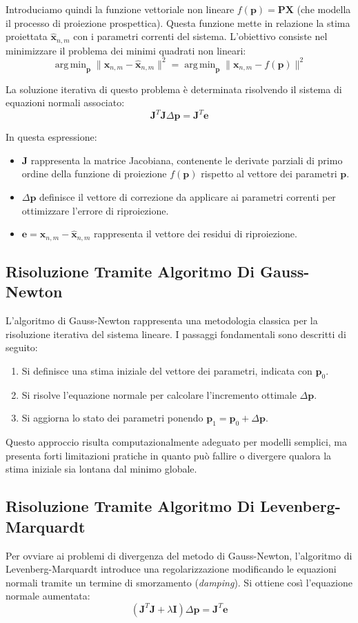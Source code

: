 ﻿\documentclass[11pt, a4paper]{article}
\DeclareMathOperator*{\argmin}{arg\,min}
\begin{document}
Introduciamo quindi la funzione vettoriale non lineare $f(\bm{p}) = \bm{P}\bm{X}$ (che modella il processo di proiezione prospettica). Questa funzione mette in relazione la stima proiettata $\hat{\bm{x}}_{n,m}$ con i parametri correnti del sistema. L'obiettivo consiste nel minimizzare il problema dei minimi quadrati non lineari:
\[ \boxed{\argmin_{\bm{p}} \lVert \bm{x}_{n,m} - \hat{\bm{x}}_{n,m} \rVert^2 = \argmin_{\bm{p}} \lVert \bm{x}_{n,m} - f(\bm{p}) \rVert^2} \]

La soluzione iterativa di questo problema è determinata risolvendo il sistema di equazioni normali associato:
\[ \boxed{\bm{J}^T \bm{J} \Delta\bm{p} = \bm{J}^T \bm{e}} \]

In questa espressione:
\begin{itemize}
    \item $\bm{J}$ rappresenta la matrice Jacobiana, contenente le derivate parziali di primo ordine della funzione di proiezione $f(\bm{p})$ rispetto al vettore dei parametri $\bm{p}$.
    \item $\Delta\bm{p}$ definisce il vettore di correzione da applicare ai parametri correnti per ottimizzare l'errore di riproiezione.
    \item $\bm{e} = \bm{x}_{n,m} - \hat{\bm{x}}_{n,m}$ rappresenta il vettore dei residui di riproiezione.
\end{itemize}

\subsection{Risoluzione Tramite Algoritmo Di Gauss-Newton}
L'algoritmo di Gauss-Newton rappresenta una metodologia classica per la risoluzione iterativa del sistema lineare. I passaggi fondamentali sono descritti di seguito:
\begin{enumerate}
    \item Si definisce una stima iniziale del vettore dei parametri, indicata con $\bm{p}_0$.
    \item Si risolve l'equazione normale per calcolare l'incremento ottimale $\Delta\bm{p}$.
    \item Si aggiorna lo stato dei parametri ponendo $\bm{p}_1 = \bm{p}_0 + \Delta\bm{p}$.
\end{enumerate}
Questo approccio risulta computazionalmente adeguato per modelli semplici, ma presenta forti limitazioni pratiche in quanto può fallire o divergere qualora la stima iniziale sia lontana dal minimo globale.

\subsection{Risoluzione Tramite Algoritmo Di Levenberg-Marquardt}
Per ovviare ai problemi di divergenza del metodo di Gauss-Newton, l'algoritmo di Levenberg-Marquardt introduce una regolarizzazione modificando le equazioni normali tramite un termine di smorzamento (\emph{damping}). Si ottiene così l'equazione normale aumentata:
\[ \boxed{(\bm{J}^T \bm{J} + \lambda \bm{I})\Delta\bm{p} = \bm{J}^T \bm{e}} \]
\end{document}
